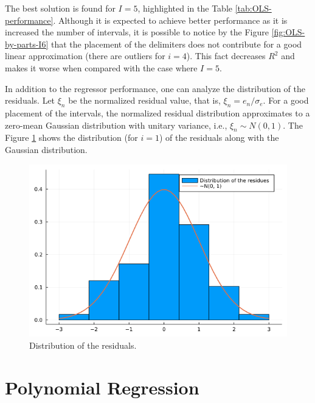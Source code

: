 \documentclass[english]{sobraep}
\begin{document}
The best solution is found for \(I=5\), highlighted in the Table \ref{tab:OLS-performance}. Although it is expected to achieve better performance as it is increased the number of intervals, it is possible to notice by the Figure \ref{fig:OLS-by-parts-I6} that the placement of the delimiters does not contribute for a good linear approximation (there are outliers for \(i=4\)). This fact decreases \(R^2\) and makes it worse when compared with the case where \(I=5\).

In addition to the regressor performance, one can analyze the distribution of the residuals. Let \(\xi_n\) be the normalized residual value, that is, \(\xi_n = e_n/\sigma_e\). For a good placement of the intervals, the normalized residual distribution approximates to a zero-mean Gaussian distribution with unitary variance, i.e., \(\xi_n \sim N(0, 1)\). The Figure \ref{fig:distribution} shows the distribution (for \(i=1\)) of the residuals along with the Gaussian distribution.

\begin{figure}
    \centering
    \includegraphics[scale=0.35]{../figs/residues_PDF_I5i1.png}
    \caption{Distribution of the residuals.}
    \label{fig:distribution}
\end{figure}

\section{Polynomial Regression}
\end{document}
